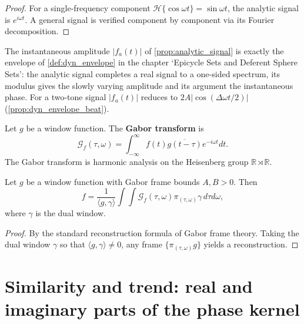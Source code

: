 \begin{proof}
For a single-frequency component $\mathcal{H}\{\cos\omega t\} = \sin\omega t$, the analytic signal is $e^{i\omega t}$. A general signal is verified component by component via its Fourier decomposition.
\end{proof}

\begin{remark}\label{rem:analytic_envelope}
The instantaneous amplitude $|f_a(t)|$ of \cref{prop:analytic_signal} is exactly the envelope of \cref{def:dyn_envelope} in the chapter `Epicycle Sets and Deferent Sphere Sets': the analytic signal completes a real signal to a one-sided spectrum, its modulus gives the slowly varying amplitude and its argument the instantaneous phase. For a two-tone signal $|f_a(t)|$ reduces to $2A|\cos(\Delta\omega t/2)|$ (\cref{prop:dyn_envelope_beat}).
\end{remark}

\begin{definition}\label{def:gabor}
Let $g$ be a window function. The \textbf{Gabor transform} is
\[
\mathcal{G}_f(\tau,\omega)=\int_{-\infty}^{\infty}f(t)\overline{g(t-\tau)}e^{-i\omega t}dt.
\]
The Gabor transform is harmonic analysis on the Heisenberg group $\mathbb{R}\rtimes\mathbb{R}$.
\end{definition}

\begin{theorem}\label{thm:gabor_reconstruction}
Let $g$ be a window function with Gabor frame bounds $A,B>0$. Then
\[
f = \frac{1}{\langle g,\gamma\rangle}\int\int\mathcal{G}_f(\tau,\omega)\pi_{(\tau,\omega)}\gamma\,d\tau d\omega,
\]
where $\gamma$ is the dual window.
\end{theorem}

\begin{proof}
By the standard reconstruction formula of Gabor frame theory. Taking the dual window $\gamma$ so that $\langle g,\gamma\rangle\ne 0$, any frame $\{\pi_{(\tau,\omega)}g\}$ yields a reconstruction.
\end{proof}

\section{\texorpdfstring{Similarity and trend: real and imaginary parts of the phase kernel}{Similarity and trend}}

